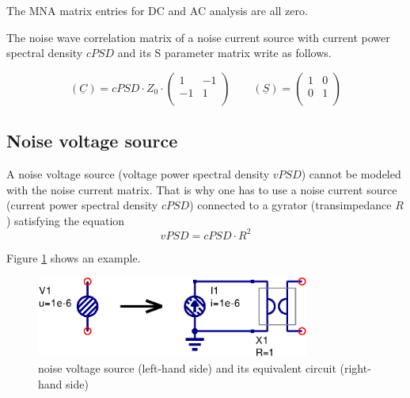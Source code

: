 The MNA matrix entries for DC and AC analysis are all zero.

\addvspace{12pt}

The noise wave correlation matrix of a noise current source with
current power spectral density $cPSD$ and its S parameter matrix
write as follows.

\begin{equation}
(\underline{C}) = cPSD\cdot Z_0\cdot
\begin{pmatrix}
   1 & -1\\
  -1 &  1\\
\end{pmatrix}
\qquad
(\underline{S}) =
\begin{pmatrix}
   1 &  0\\
   0 &  1\\
\end{pmatrix}
\end{equation}


\subsection{Noise voltage source}

A noise voltage source (voltage power spectral density $vPSD$) cannot
be modeled with the noise current matrix.  That is why one has to use
a noise current source (current power spectral density $cPSD$)
connected to a gyrator (transimpedance $R$) satisfying the equation
\begin{equation}
vPSD = cPSD \cdot R^2
\end{equation}

Figure \ref{fig:Unoise} shows an example.
\begin{figure}[ht]
\begin{center}
\includegraphics[width=9cm]{Unoise}
\end{center}
\caption{noise voltage source (left-hand side) and its equivalent circuit (right-hand side)}
\label{fig:Unoise}
\end{figure}
\FloatBarrier

